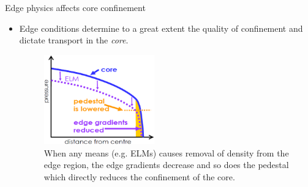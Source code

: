 \documentclass{beamer}
\begin{document}
\begin{frame}{Edge physics affects core confinement}
\begin{itemize}
\item Edge conditions determine to a great extent the quality of confinement and dictate transport in the \emph{core}.

\begin{figure}
  \centering
    \includegraphics[width=0.45\textwidth]{graphics/ELM_effect_on_confinement}
  \caption{When any means (e.g. ELMs) causes removal of density from the edge region, the edge gradients decrease and so does the pedestal which directly reduces the confinement of the core.}
\end{figure}
\end{itemize}


\end{frame}

\end{document}
